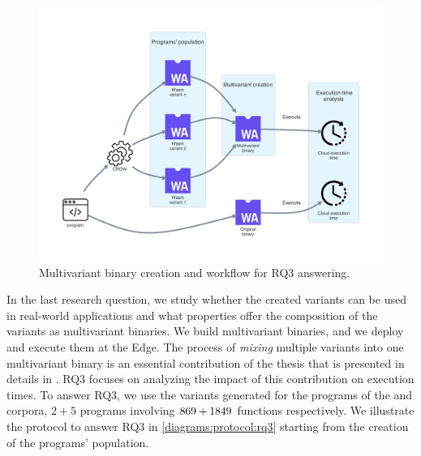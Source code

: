
\section{\rqthree}
\label{rq3:method}

\newcommand{\mewe}{MEWE\xspace}

\begin{figure}[h]
    \centering
    \includegraphics[width=0.8\linewidth]{diagrams/Rq3.pdf}
    \caption{Multivariant binary creation and workflow for RQ3 answering.}
    \label{diagrams:protocol:rq3}
\end{figure}

In the last research question, we study whether the created variants can be used in real-world applications and what properties offer the composition of the variants as multivariant binaries. We build multivariant binaries, and we deploy and execute them at the Edge. The process of \emph{mixing} multiple variants into one multivariant binary is an essential contribution of the thesis that is presented in details in \citationneeded. RQ3 focuses on analyzing the impact of this contribution on execution times. To answer RQ3, we use the variants generated for the programs of the \corpussodium and \corpusqrcode corpora, $2 + 5$ programs involving $ 869 + 1849$ functions respectively. We illustrate the protocol to answer RQ3 in \autoref{diagrams:protocol:rq3} starting from the creation of the programs' population.




